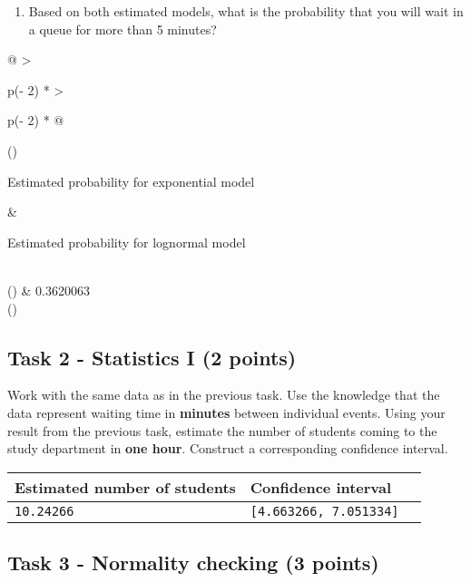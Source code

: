 \documentclass[
]{article}
\providecommand{\tightlist}{%
  \setlength{\itemsep}{0pt}\setlength{\parskip}{0pt}}
\begin{document}
\begin{enumerate}
\def\labelenumi{\alph{enumi})}
\setcounter{enumi}{4}
\tightlist
\item
  Based on both estimated models, what is the probability that you will
  wait in a queue for more than 5 minutes?
\end{enumerate}

\begin{longtable}[]{@{}
  >{\raggedright\arraybackslash}p{(\columnwidth - 2\tabcolsep) * }
  >{\raggedright\arraybackslash}p{(\columnwidth - 2\tabcolsep) * }@{}}
\toprule()
\begin{minipage}[b]{\linewidth}\raggedright
Estimated probability for exponential model
\end{minipage} & \begin{minipage}[b]{\linewidth}\raggedright
Estimated probability for lognormal model
\end{minipage} \\
\midrule()
 & 0.3620063 \\
\bottomrule()
\end{longtable}

\hypertarget{task-2---statistics-i-2-points}{%
\subsection{Task 2 - Statistics I (2
points)}\label{task-2---statistics-i-2-points}}

Work with the same data as in the previous task. Use the knowledge that
the data represent waiting time in \textbf{minutes} between individual
events. Using your result from the previous task, estimate the number of
students coming to the study department in \textbf{one hour}. Construct
a corresponding confidence interval.

\begin{longtable}[]{@{}lll@{}}
\toprule()
Estimated number of students & Confidence interval & \\
\midrule()
\endhead
\texttt{10.24266} & \texttt{{[}4.663266,\ 7.051334{]}} & \\
\bottomrule()
\end{longtable}

\hypertarget{task-3---normality-checking-3-points}{%
\subsection{Task 3 - Normality checking (3
points)}\label{task-3---normality-checking-3-points}}
\end{document}
